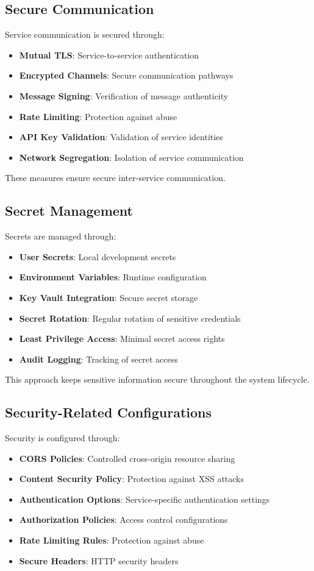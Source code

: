 \subsection{Secure Communication}
Service communication is secured through:
\begin{itemize}
    \item \textbf{Mutual TLS}: Service-to-service authentication
    \item \textbf{Encrypted Channels}: Secure communication pathways
    \item \textbf{Message Signing}: Verification of message authenticity
    \item \textbf{Rate Limiting}: Protection against abuse
    \item \textbf{API Key Validation}: Validation of service identities
    \item \textbf{Network Segregation}: Isolation of service communication
\end{itemize}

These measures ensure secure inter-service communication.

\subsection{Secret Management}
Secrets are managed through:
\begin{itemize}
    \item \textbf{User Secrets}: Local development secrets
    \item \textbf{Environment Variables}: Runtime configuration
    \item \textbf{Key Vault Integration}: Secure secret storage
    \item \textbf{Secret Rotation}: Regular rotation of sensitive credentials
    \item \textbf{Least Privilege Access}: Minimal secret access rights
    \item \textbf{Audit Logging}: Tracking of secret access
\end{itemize}

This approach keeps sensitive information secure throughout the system lifecycle.

\subsection{Security-Related Configurations}
Security is configured through:
\begin{itemize}
    \item \textbf{CORS Policies}: Controlled cross-origin resource sharing
    \item \textbf{Content Security Policy}: Protection against XSS attacks
    \item \textbf{Authentication Options}: Service-specific authentication settings
    \item \textbf{Authorization Policies}: Access control configurations
    \item \textbf{Rate Limiting Rules}: Protection against abuse
    \item \textbf{Secure Headers}: HTTP security headers
\end{itemize}

